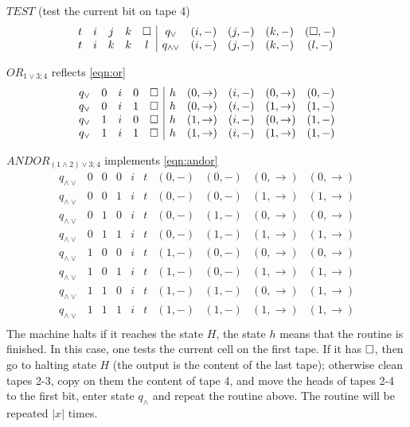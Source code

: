 \documentclass{lmcs}
\begin{document}
$TEST$ (test the current bit on tape 4)
$$
\begin{array}{ccccc|ccccc}
t & i & j & k & \square & q_\vee  & (i,-) & (j,-) & (k,-) & (\square ,- )\\
t & i & k & k & l & q_{\wedge\vee}  & (i,-) & (j,-) & (k,-) & (l,- )
\end{array}
$$

$OR_{1\vee 3;4}$ reflects \eqref{eqn:or}
$$
\begin{array}{ccccc|ccccc}
q_\vee & 0 & i & 0 & \square & h  & (0,\rightarrow) & (i,-) & (0,\rightarrow) & (0,- )\\
q_\vee & 0 & i & 1 & \square & h  & (0,\rightarrow) & (i,-) & (1,\rightarrow) & (1,- )\\
q_\vee & 1 & i & 0 & \square & h  & (1,\rightarrow) & (i,-) & (0,\rightarrow) & (1,- )\\
q_\vee & 1 & i & 1 & \square & h  & (1,\rightarrow) & (i,-) & (1,\rightarrow) & (1,- )
\end{array}
$$

$ANDOR_{(1\wedge 2)\vee 3 ;4}$ implements \eqref{eqn:andor}
$$
\begin{array}{ccccc|ccccc}
q_{\wedge\vee} & 0 & 0 & 0 & i & t & (0,-) & (0,-) & (0,\rightarrow ) & (0,\rightarrow)\\
q_{\wedge\vee} & 0 & 0 & 1 & i & t & (0,-) & (0,-) & (1,\rightarrow ) & (1,\rightarrow)\\
q_{\wedge\vee} & 0 & 1 & 0 & i & t & (0,-) & (1,-) & (0,\rightarrow ) & (0,\rightarrow)\\
q_{\wedge\vee} & 0 & 1 & 1 & i & t & (0,-) & (1,-) & (1,\rightarrow ) & (1,\rightarrow)\\
q_{\wedge\vee} & 1 & 0 & 0 & i & t & (1,-) & (0,-) & (0,\rightarrow ) & (0,\rightarrow)\\
q_{\wedge\vee} & 1 & 0 & 1 & i & t & (1,-) & (0,-) & (1,\rightarrow ) & (1,\rightarrow)\\
q_{\wedge\vee} & 1 & 1 & 0 & i & t & (1,-) & (1,-) & (0,\rightarrow ) & (1,\rightarrow)\\
q_{\wedge\vee} & 1 & 1 & 1 & i & t & (1,-) & (1,-) & (1,\rightarrow ) & (1,\rightarrow)\\
\end{array}
$$
The machine halts if it reaches the state $H$, the state $h$ means that the routine is finished. In this case, one tests the current cell on the first tape. If it has $\square$, then go to halting state $H$ (the output is the content of the last tape); otherwise clean tapes 2-3, copy on them the content of tape 4, and  move the heads of tapes 2-4 to the first bit, enter state $q_\wedge$ and repeat the routine above. The routine will be repeated $|x|$ times.
\end{document}
